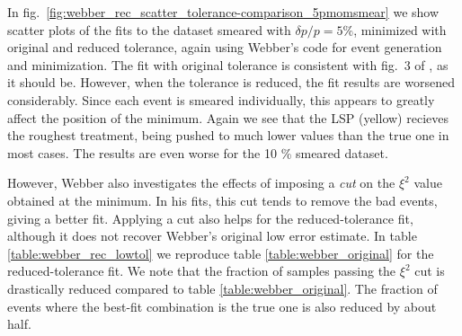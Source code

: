 \documentclass[twoside,english]{uiofysmaster}
\begin{document}
In fig.\ \ref{fig:webber_rec_scatter_tolerance-comparison_5pmomsmear} we show scatter plots of the fits to the dataset smeared with $\delta p/p = 5 \%$, minimized with original and reduced tolerance, again using Webber's code for event generation and minimization. The fit with original tolerance is consistent with fig.\ 3 of \cite{Webber:2009vm}, as it should be. However, when the tolerance is reduced, the fit results are worsened considerably. Since each event is smeared individually, this appears to greatly affect the position of the minimum. Again we see that the LSP (yellow) recieves the roughest treatment, being pushed to much lower values than the true one in most cases. The results are even worse for the 10 \% smeared dataset. 






However, Webber also investigates the effects of imposing a {\it cut} on the $\xi^2$ value obtained at the minimum. In his fits, this cut tends to remove the bad events, giving a better fit. Applying a cut also helps for the reduced-tolerance fit, although it does not recover Webber's original low error estimate. In table \ref{table:webber_rec_lowtol} we reproduce table \ref{table:webber_original} for the reduced-tolerance fit. We note that the fraction of samples passing the $\xi^2$ cut is drastically reduced compared to table \ref{table:webber_original}. The fraction of events where the best-fit combination is the true one is also reduced by about half. 
\end{document}
